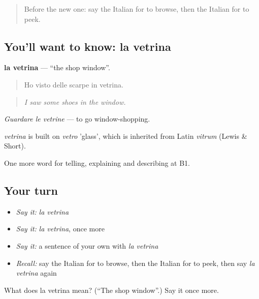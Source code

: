 \label{lesson:IT-C451-vetrina}



\begin{quote}
Before the new one: say the Italian for to browse, then the Italian for to peek.
\end{quote}

\subsection*{You'll want to know: la vetrina}
\textbf{la vetrina} — \textquotedblleft{}the shop window\textquotedblright{}.

\begin{quote}
Ho visto delle scarpe in vetrina.
\end{quote}

\begin{quote}
\emph{I saw some shoes in the window.}
\end{quote}

\emph{Guardare le vetrine} — to go window-shopping.

\begin{cousinweb}
\emph{vetrina} is built on \emph{vetro} 'glass', which is inherited from Latin \emph{vitrum} (Lewis \& Short).
\end{cousinweb}

\begin{grammarlens}[title={What you've built}]
One more word for telling, explaining and describing at B1.
\end{grammarlens}

\subsection*{Your turn}
\begin{itemize}
\raggedright
  \item \emph{Say it:} \emph{la vetrina}
  \item \emph{Say it:} \emph{la vetrina}, once more
  \item \emph{Say it:} a sentence of your own with \emph{la vetrina}
  \item \emph{Recall:} say the Italian for to browse, then the Italian for to peek, then say \emph{la vetrina} again
\end{itemize}

\begin{tcolorbox}[breakable,colback=teal!4,colframe=teal!35!black,title={Before you move on}]
What does la vetrina mean? (\textquotedblleft{}The shop window\textquotedblright{}.) Say it once more.
\end{tcolorbox}
